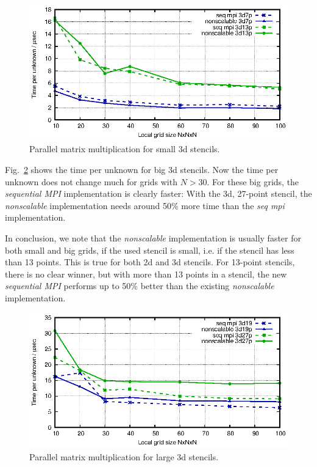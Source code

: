 \begin{figure}[tbp]
	\centering
	\vspace*{-2.5mm}\includegraphics[width=1\textwidth]{times_3dsmall}
	\caption{Parallel matrix multiplication for small 3d stencils. } 
	\label{fig:mat_ex_test_ex2_times_3dsmall}
\end{figure}

Fig.~\ref{fig:mat_ex_test_ex2_times_3dlarge} shows the time per unknown for big 3d stencils. Now the time per unknown does not change much for grids with $N > 30$. For these big grids, the \textit{sequential MPI} implementation is clearly faster: With the 3d, 27-point stencil, the \textit{nonscalable} implementation needs around 50\% more time than the \textit{seq mpi} implementation. 

In conclusion, we note that the \textit{nonscalable} implementation is usually faster for both small and big grids, if the used stencil is small, i.e. if the stencil has less than 13 points. This is true for both 2d and 3d stencils. For 13-point stencils, there is no clear winner, but with more than 13 points in a stencil, the new \textit{sequential MPI} performs up to 50\% better than the existing \textit{nonscalable} implementation.

\begin{figure}[tbp]
	\centering
	\vspace*{-2.5mm}\includegraphics[width=1\textwidth]{times_3dlarge}
	\caption{Parallel matrix multiplication for large 3d stencils.} 
	\label{fig:mat_ex_test_ex2_times_3dlarge}
\end{figure}

